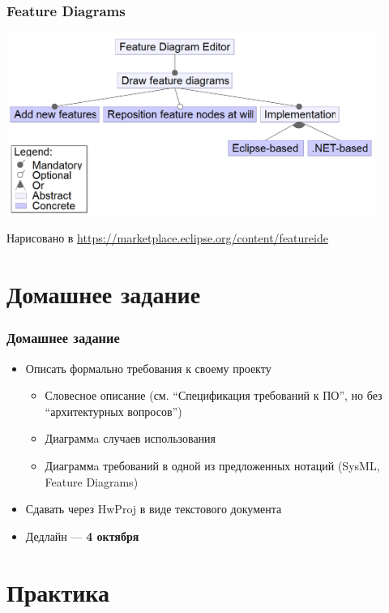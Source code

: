 \documentclass[xetex,mathserif,serif]{beamer}
\begin{document}
	\begin{frame}
		\frametitle{Feature Diagrams}
		\begin{center}
			\includegraphics[width=0.9\textwidth]{featureDiagram.png}
		\end{center}
		\begin{footnotesize}
			Нарисовано в \url{https://marketplace.eclipse.org/content/featureide}
		\end{footnotesize}
	\end{frame}

	\section{Домашнее задание}

	\begin{frame}
		\frametitle{Домашнее задание}
		\begin{itemize}
			\item Описать формально требования к своему проекту
			\begin{itemize}
				\item Словесное описание (см. ``Спецификация требований к ПО'', но без ``архитектурных вопросов'')
				\item Диаграммa случаев использования
				\item Диаграммa требований в одной из предложенных нотаций (SysML, Feature Diagrams)
			\end{itemize}
			\item Сдавать через HwProj в виде текстового документа
			\item Дедлайн --- \textbf{4 октября}
		\end{itemize}
	\end{frame}

	\section{Практика}
\end{document}
